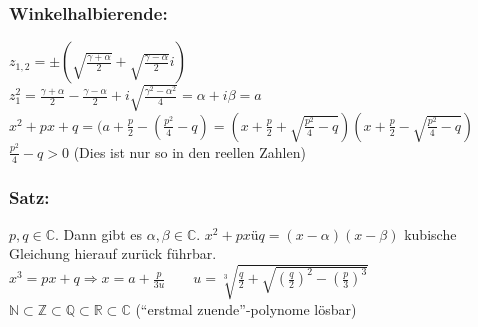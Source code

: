 \subsubsection{Winkelhalbierende:}
$z_{1,2}=\pm(\sqrt{\frac{\gamma + \alpha}{2}} + \sqrt{\frac{\gamma-\alpha}{2}}i)$\\
$z_{1}^{2}=\frac{\gamma+\alpha}{2}-\frac{\gamma-\alpha}{2}+i\sqrt{\frac{\gamma^{2}-\alpha^{2}}{4}}=\alpha+i\beta=a$\\
$x^{2}+px+q=(a+\frac{p}{2}-(\frac{p^{2}}{4}-q)=(x+\frac{p}{2}+\sqrt{\frac{p^{2}}{4}-q})(x+\frac{p}{2}-\sqrt{\frac{p^{2}}{4}-q})$\\
$\frac{p^ {2}}{4}-q>0$ (Dies ist nur so in den reellen Zahlen)
%
%
%
\subsubsection{Satz:}
$p,q\in\mathbb{C}.$ Dann gibt es $\alpha,\beta\in\mathbb{C}.$ $x^{2}+pxüq=(x-\alpha)(x-\beta)$ kubische Gleichung hierauf zurück führbar.\\
$x^{3}=px+q\Rightarrow x=a+\frac{p}{3u} \qquad u=\sqrt[3]{\frac{q}{2}+\sqrt{(\frac{q}{2})^{2}-(\frac{p}{3})^{3}}}$\\
$\mathbb{N}\subset \mathbb{Z}\subset\mathbb{Q}\subset\mathbb{R}\subset\mathbb{C}$ ("`erstmal zuende"'-polynome lösbar)